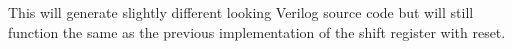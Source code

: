 \documentclass[twocolumn, 10pt]{article}
\begin{document}
This will generate slightly different looking Verilog source code but will still function the same as the previous implementation of the shift register with reset.



%
%
%
%
\end{document}
